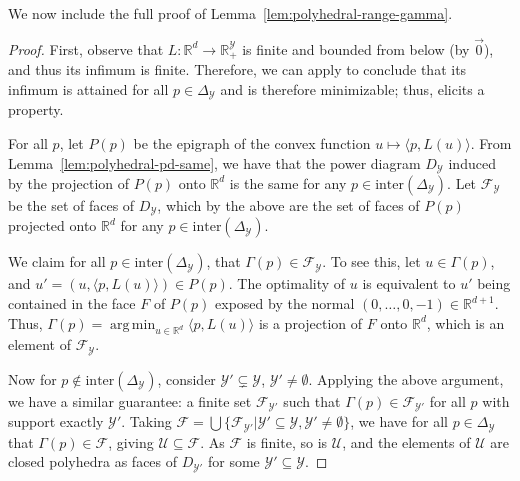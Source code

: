 \documentclass[11pt]{article}
\newcommand{\reals}{\mathbb{R}}
\newcommand{\simplex}{\Delta_\Y}
\newcommand{\F}{\mathcal{F}}
\newcommand{\U}{\mathcal{U}}
\newcommand{\Y}{\mathcal{Y}}
\newcommand{\inprod}[2]{\langle #1, #2 \rangle}%
\newcommand{\inter}{\mathrm{inter}}
\DeclareMathOperator*{\argmin}{arg\,min}
\begin{document}
We now include the full proof of Lemma~\ref{lem:polyhedral-range-gamma}.

\polyhedralrangegamma*
\begin{proof}
	First, observe that $L: \reals^d \to \reals^\Y_+$ is finite and bounded from below (by $\vec 0$), and thus its infimum is finite. 
	Therefore, we can apply \citet[Corollary 19.3.1]{rockafellar1997convex} to conclude that its infimum is attained for all $p \in \simplex$ and is therefore minimizable; thus, elicits a property.
	
	For all $p$, let $P(p)$ be the epigraph of the convex function $u\mapsto \inprod{p}{L(u)}$.
	From Lemma~\ref{lem:polyhedral-pd-same}, we have that the power diagram $D_\Y$ induced by the projection of $P(p)$ onto $\reals^d$ is the same for any $p\in\inter(\simplex)$.
	Let $\F_\Y$ be the set of faces of $D_\Y$, which by the above are the set of faces of $P(p)$ projected onto $\reals^d$ for any $p\in\inter(\simplex)$.
	
	We claim for all $p\in\inter(\simplex)$, that $\Gamma(p) \in \F_\Y$.
	To see this, let $u \in \Gamma(p)$, and $u' = (u,\inprod{p}{L(u)}) \in P(p)$.
	The optimality of $u$ is equivalent to $u'$ being contained in the face $F$ of $P(p)$ exposed by the normal $(0,\ldots,0,-1)\in\reals^{d+1}$.
	Thus, $\Gamma(p) = \argmin_{u\in\reals^d} \inprod{p}{L(u)}$ is a projection of $F$ onto $\reals^d$, which is an element of $\F_\Y$.
	
	Now for $p \not \in \inter(\simplex)$, consider $\Y'\subsetneq \Y$, $\Y'\neq\emptyset$.
	Applying the above argument, we have a similar guarantee: a finite set $\F_{\Y'}$ such that $\Gamma(p) \in \F_{\Y'}$ for all $p$ with support exactly $\Y'$.
	Taking $\F = \bigcup\{\F_{\Y'} | \Y'\subseteq\Y, \Y'\neq\emptyset\}$, we have for all $p\in\simplex$ that $\Gamma(p) \in \F$, giving $\U \subseteq \F$.
	As $\F$ is finite, so is $\U$, and the elements of $\U$ are closed polyhedra as faces of $D_{\Y'}$ for some $\Y'\subseteq\Y$.
\end{proof}
\end{document}
